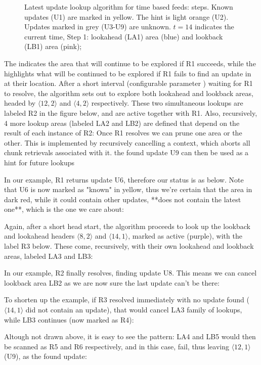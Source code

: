 \begin{figure}[htbp]
\begin{tabular}{c|c}
\end{tabular}
\caption[Latest update lookup algorithm for time based feeds]{Latest update lookup algorithm for time based feeds: steps. Known updates (U1) are marked in yellow. The hint is light orange (U2). Updates marked in grey (U3-U9) are unknown. $t=14$ indicates the current time, Step 1: lookahead (LA1) area (blue) and lookback (LB1) area (pink); }
\label{fig:feeds-lookup-1}
\end{figure}

The  indicates the area that will continue to be explored if R1 succeeds, while the  highlights what will be continued to be explored if R1 fails to find an update in at their location. After a short interval (configurable parameter ) waiting for R1 to resolve, the algorithm sets out to explore both lookahead and lookback areas, headed by  $\langle  12, 2 \rangle$ and $\langle  4, 2 \rangle$ respectively. These two simultaneous lookups are labeled R2 in the figure below, and are active together with R1. Also, recursively, 4 more lookup areas (labeled LA2 and LB2) are defined that depend on the result of each instance of R2:
Once R1 resolves we can prune one area or the other. This is implemented by recursively cancelling a context, which aborts all chunk retrievals associated with it. the found update U9 can then be used as a hint for future lookups

In our example, R1 returns update U6, therefore our status is as below. Note that U6 is now marked as "known" in yellow, thus we're certain that the area in dark red, while it could contain other updates, **does not contain the latest one**, which is the one we care about:


Again, after a short head start, the algorithm proceeds to look up the lookback and lookahead headers $\langle  8, 2 \rangle$ and $\langle  14, 1 \rangle$, marked as active (purple), with the label R3 below. These come, recursively, with their own lookahead and lookback areas, labeled LA3 and LB3:

In our example, R2 finally resolves, finding update U8. This means we can cancel lookback area LB2 as we are now sure the last update can't be there:


To shorten up the example, if R3 resolved immediately with no update found ($\langle  14, 1 \rangle$ did not contain an update), that would cancel LA3 family of lookups, while LB3 continues (now marked as R4):


Altough not drawn above, it is easy to see the pattern: LA4 and LB5 would then be scanned as R5 and R6 respectively, and in this case, fail, thus leaving $\langle  12, 1 \rangle$ (U9), as the found update:


